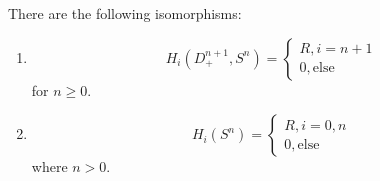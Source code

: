 \begin{thm}
    There are the following isomorphisms:
    \begin{enumerate}
        \item \begin{equation*}
            H_i(D_+^{n+1}, S^n)=\begin{cases}
                R, i=n+1\\
                0, \text{else}
            \end{cases}
        \end{equation*}
        for $n\geq 0$.
        \item \begin{equation*}
            H_i(S^n)=\begin{cases}
                R, i=0,n\\
                0, \text{else}
            \end{cases}
        \end{equation*}
        where $n>0$.
    \end{enumerate}
\end{thm}
